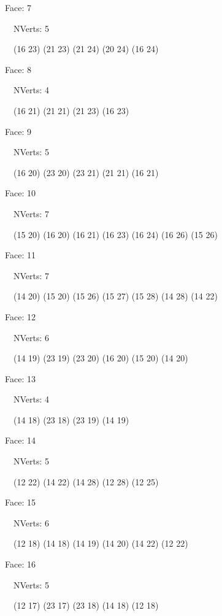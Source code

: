 \documentclass{article}
\begin{document}
{\footnotesize 

Face: 7

\   \    NVerts: 5

 \   \   (16 23) (21 23) (21 24) (20 24) (16 24)}

{\footnotesize 

Face: 8

\   \    NVerts: 4

 \   \   (16 21) (21 21) (21 23) (16 23)}

{\footnotesize 

Face: 9

\   \    NVerts: 5

 \   \   (16 20) (23 20) (23 21) (21 21) (16 21)}

{\footnotesize 

Face: 10

\   \    NVerts: 7

 \   \   (15 20) (16 20) (16 21) (16 23) (16 24) (16 26) (15 26)}

{\footnotesize 

Face: 11

\   \    NVerts: 7

 \   \   (14 20) (15 20) (15 26) (15 27) (15 28) (14 28) (14 22)}

{\footnotesize 

Face: 12

\   \    NVerts: 6

 \   \   (14 19) (23 19) (23 20) (16 20) (15 20) (14 20)}

{\footnotesize 

Face: 13

\   \    NVerts: 4

 \   \   (14 18) (23 18) (23 19) (14 19)}

{\footnotesize 

Face: 14

\   \    NVerts: 5

 \   \   (12 22) (14 22) (14 28) (12 28) (12 25)}

{\footnotesize 

Face: 15

\   \    NVerts: 6

 \   \   (12 18) (14 18) (14 19) (14 20) (14 22) (12 22)}

{\footnotesize 

Face: 16

\   \    NVerts: 5

 \   \   (12 17) (23 17) (23 18) (14 18) (12 18)}
\end{document}

